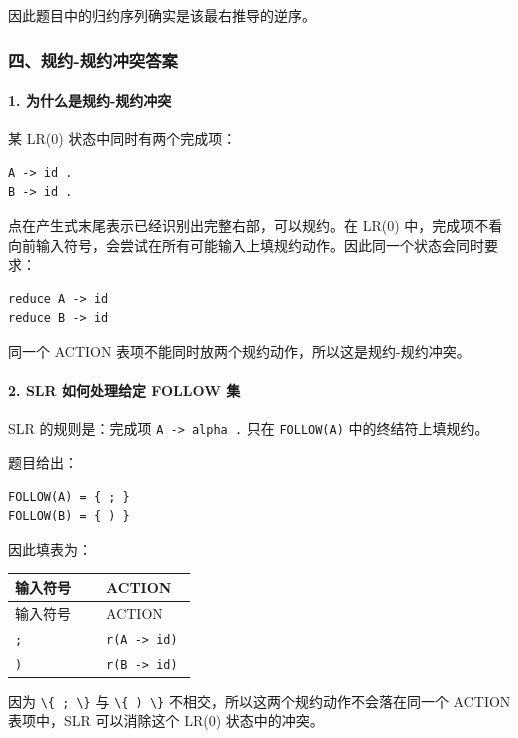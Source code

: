 \documentclass[UTF8]{ctexart}
\begin{document}
因此题目中的归约序列确实是该最右推导的逆序。

\subsubsection*{四、规约-规约冲突答案}

\paragraph*{1. 为什么是规约-规约冲突}

某 LR(0) 状态中同时有两个完成项：

\begin{Verbatim}[fontsize=\small,breaklines=true]
A -> id .
B -> id .
\end{Verbatim}

点在产生式末尾表示已经识别出完整右部，可以规约。在 LR(0) 中，完成项不看向前输入符号，会尝试在所有可能输入上填规约动作。因此同一个状态会同时要求：

\begin{Verbatim}[fontsize=\small,breaklines=true]
reduce A -> id
reduce B -> id
\end{Verbatim}

同一个 ACTION 表项不能同时放两个规约动作，所以这是规约-规约冲突。

\paragraph*{2. SLR 如何处理给定 FOLLOW 集}

SLR 的规则是：完成项 \texttt{A -> alpha .} 只在 \texttt{FOLLOW(A)} 中的终结符上填规约。

题目给出：

\begin{Verbatim}[fontsize=\small,breaklines=true]
FOLLOW(A) = { ; }
FOLLOW(B) = { ) }
\end{Verbatim}

因此填表为：

\begin{longtable}{|p{0.47\linewidth}|p{0.47\linewidth}|}
\hline
输入符号 & ACTION \\
\hline
\endfirsthead
输入符号 & ACTION \\
\hline
\endhead
\texttt{;} & \texttt{r(A -> id)} \\
\hline
\texttt{)} & \texttt{r(B -> id)} \\
\hline
\end{longtable}

因为 \texttt{\textbackslash{}\{ ; \textbackslash{}\}} 与 \texttt{\textbackslash{}\{ ) \textbackslash{}\}} 不相交，所以这两个规约动作不会落在同一个 ACTION 表项中，SLR 可以消除这个 LR(0) 状态中的冲突。
\end{document}

